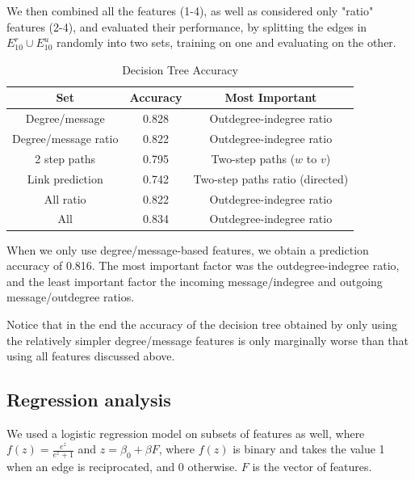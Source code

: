 \documentclass[conference]{IEEEtran}
\begin{document}
We then combined all the features (1-4), as well as considered only "ratio" features (2-4), and evaluated their performance, by splitting the edges in $E^r_10 \cup E_10^u$ randomly into two sets, training on one and evaluating on the other.

\begin{table}[!t]
\renewcommand{\arraystretch}{1.3}
\caption{Decision Tree Accuracy}
\label{table_recresults_dtree}
\centering
\begin{tabular}{|c||c|c|}
\hline
\bf{Set} & Accuracy & Most Important \\
\hline
Degree/message & 0.828 & Outdegree-indegree ratio \\
Degree/message ratio & 0.822 & Outdegree-indegree ratio \\
2 step paths & 0.795 & Two-step paths ($w$ to $v$) \\
Link prediction & 0.742 & Two-step paths ratio (directed) \\
All ratio & 0.822 & Outdegree-indegree ratio \\
All & 0.834 & Outdegree-indegree ratio \\
\hline
\end{tabular}
\end{table}

When we only use degree/message-based features, we obtain a prediction accuracy of 0.816. The most important factor was the outdegree-indegree ratio, and the least important factor the incoming message/indegree and outgoing message/outdegree ratios.

Notice that in the end the accuracy of the decision tree obtained by only using the relatively simpler degree/message features is only marginally worse than that using all features discussed above.

\subsection{Regression analysis}
We used a logistic regression model on subsets of features as well, where $f(z) = \frac{e^z}{e^z+1}$ and $z = \beta_0 + \beta F$, where $f(z)$ is binary and takes the value 1 when an edge is reciprocated, and 0 otherwise. $F$ is the vector of features.
\end{document}
